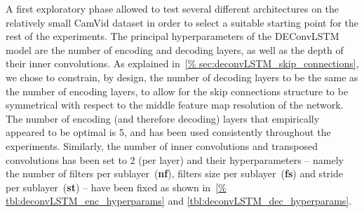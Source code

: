 A first exploratory phase allowed to test several different architectures on
the relatively small CamVid dataset in order to select a suitable starting
point for the rest of the experiments. The principal hyperparameters of the
DEConvLSTM model are the number of encoding and decoding layers, as well as the
depth of their inner convolutions. As explained in~\autoref{%
sec:deconvLSTM_skip_connections}, we chose to constrain, by design, the number
of decoding layers to be the same as the number of encoding layers, to allow
for the skip connections structure to be symmetrical with respect to the middle
feature map resolution of the network. The number of encoding (and therefore
decoding) layers that empirically appeared to be optimal is 5, and has been
used consistently throughout the experiments.  Similarly, the number of inner
convolutions and transposed convolutions has been set to 2 (per layer) and
their hyperparameters -- namely the number of filters per
sublayer~(\textbf{nf}), filters size per sublayer~(\textbf{fs}) and stride per
sublayer~(\textbf{st}) -- have been fixed as shown in~\autoref{%
tbl:deconvLSTM_enc_hyperparams} and \autoref{tbl:deconvLSTM_dec_hyperparams}.

\begin{table}[t]
    \caption{ConvLSTM hyperparameters. Number of filters per
        sublayer~(\textbf{nf}), filters size per sublayer~(\textbf{fs}) and
        stride per sublayer~(\textbf{st}).}
    \label{tbl:deconvLSTM_enc_hyperparams}
\end{table}

